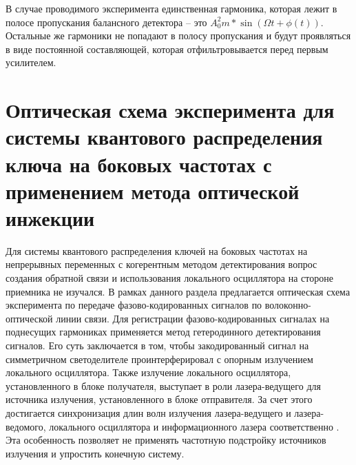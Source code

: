 В случае проводимого эксперимента единственная гармоника, которая лежит в полосе пропускания балансного детектора -- это $A_0^2m*\sin(\Omega t   + \phi (t))$.
Остальные же гармоники не попадают в полосу пропускания и будут проявляться в виде постоянной составляющей, которая отфильтровывается перед первым усилителем. 

\section{Оптическая схема эксперимента для системы квантового распределения ключа на боковых частотах с применением метода оптической инжекции}\label{sec:ch2/sect4}
Для системы квантового распределения ключей на боковых частотах на непрерывных переменных с когерентным методом детектирования вопрос создания обратной связи и использования локального осциллятора на стороне приемника не изучался. В рамках данного раздела предлагается оптическая схема эксперимента по передаче фазово-кодированных сигналов по волоконно-оптической линии связи. Для регистрации фазово-кодированных сигналах на поднесущих гармониках применяется метод гетеродинного детектирования сигналов. Его суть заключается в том, чтобы закодированный сигнал на симметричном светоделителе проинтерферировал с опорным излучением локального осциллятора. Также излучение локального осциллятора, установленного в блоке получателя, выступает в роли лазера-ведущего для источника излучения, установленного в блоке отправителя. За счет этого достигается синхронизация длин волн излучения лазера-ведущего и лазера-ведомого, локального осциллятора и информационного лазера соответственно \cite{khaksar2023a, su2022}. Эта особенность позволяет не применять частотную подстройку источников излучения и упростить конечную систему.

